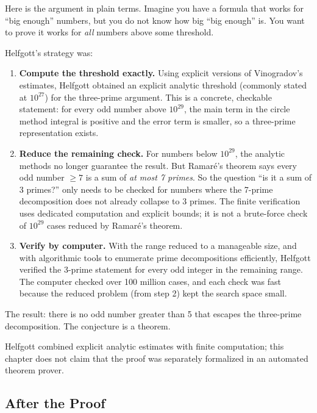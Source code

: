 Here is the argument in plain terms. Imagine you have a formula that works for ``big enough'' numbers, but you do not know how big ``big enough'' is. You want to prove it works for \emph{all} numbers above some threshold.

Helfgott's strategy was:

\begin{enumerate}
\item \textbf{Compute the threshold exactly.} Using explicit versions of Vinogradov's estimates, Helfgott obtained an explicit analytic threshold (commonly stated at $10^{27}$) for the three-prime argument. This is a concrete, checkable statement: for every odd number above $10^{29}$, the main term in the circle method integral is positive and the error term is smaller, so a three-prime representation exists.

\item \textbf{Reduce the remaining check.} For numbers below $10^{29}$, the analytic methods no longer guarantee the result. But Ramar\'e's theorem says every odd number $\geq 7$ is a sum of \emph{at most 7 primes}. So the question ``is it a sum of 3 primes?'' only needs to be checked for numbers where the 7-prime decomposition does not already collapse to 3 primes. The finite verification uses dedicated computation and explicit bounds; it is not a brute-force check of $10^{29}$ cases reduced by Ramaré's theorem.

\item \textbf{Verify by computer.} With the range reduced to a manageable size, and with algorithmic tools to enumerate prime decompositions efficiently, Helfgott verified the 3-prime statement for every odd integer in the remaining range. The computer checked over 100 million cases, and each check was fast because the reduced problem (from step 2) kept the search space small.
\end{enumerate}

The result: there is no odd number greater than 5 that escapes the three-prime decomposition. The conjecture is a theorem.

\begin{highlightbox}
Helfgott combined explicit analytic estimates with finite computation; this chapter does not claim that the proof was separately formalized in an automated theorem prover.
\end{highlightbox}

\subsection{After the Proof}

